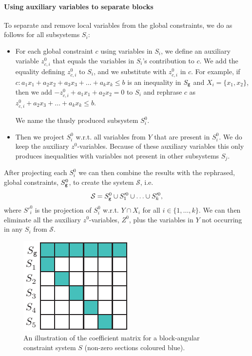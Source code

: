 \paragraph{Using auxiliary variables to separate blocks}  
To separate and remove local variables from the global constraints, we do as follows for all subsystems $S_i$:
\begin{itemize}\itemsep0em
\item For each global constraint $c$ using variables in $S_i$, we define an auxiliary variable $z^0_{c,i}$ that equals the variables in $S_i$'s contribution to $c$. We add the equality defining $z^0_{c,i}$ to $S_i$, and we substitute with $z^0_{c,i}$ in $c$. For example, if $c: a_1x_1 + a_2x_2 + a_3x_3 + \ldots + a_kx_k \leq b$ is an inequality in $S_{\texttt{g}}$ and $X_i = \{x_1,x_2\}$, then we add $-z^0_{c,i} + a_1x_1 + a_2x_2 = 0$ to $S_i$ and rephrase $c$ as $z^0_{c,i} + a_2x_3 + \ldots + a_kx_k \leq b$. 

We name the thusly produced subsystem $S_i^0$. 
\item Then we project $S_i^0$ w.r.t. all variables from $Y$ that are present in $S_i^0$. We do keep the auxiliary $z^0$-variables. 
Because of these auxiliary variables this only produces inequalities with variables not present in other subsystems $S_j$. 
\end{itemize}
After projecting each $S_i^0$ we can then combine the results with the rephrased, global constraints, $S_{\texttt{g}}^0$, to create the system $\mathcal{S}$, i.e. 
\[
\mathcal{S} = S^0_{\texttt{g}} \cup S'^0_1\cup \ldots \cup S'^0_k,
\]
where $S'^0_i$ is the projection of $S^0_i$ w.r.t. $Y\cap X_i$ for all $i\in\{1,\ldots, k\}$.
We can then eliminate all the auxiliary $z^0$-variables, $Z^0$, plus the variables in $Y$ not occurring in any $S_i$ from $\mathcal{S}$. %

\begin{figure}[htbp]
	\centering
		\includegraphics{figures/recursiveProjectionEs(a).pdf}
	\caption{An illustration of the coefficient matrix for a block-angular constraint system $S$ (non-zero sections coloured blue).}
	\label{fig:decomp}
\end{figure}

